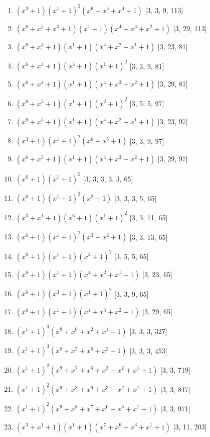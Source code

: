 \documentclass[10pt,twocolumn]{article}
\begin{document}
\begin{enumerate}
\item $(x^{3} + 1)(x^{1} + 1)^{2}(x^{6} + x^{5} + x^{4} + 1)$  [3, 3, 9, 113]
\item $(x^{6} + x^{5} + x^{4} + 1)(x^{1} + 1)(x^{4} + x^{3} + x^{2} + 1)$  [3, 29, 113]
\item $(x^{6} + x^{4} + 1)(x^{1} + 1)(x^{4} + x^{2} + x^{1} + 1)$  [3, 23, 81]
\item $(x^{6} + x^{4} + 1)(x^{3} + 1)(x^{1} + 1)^{2}$  [3, 3, 9, 81]
\item $(x^{6} + x^{4} + 1)(x^{1} + 1)(x^{4} + x^{3} + x^{2} + 1)$  [3, 29, 81]
\item $(x^{6} + x^{5} + 1)(x^{1} + 1)(x^{2} + 1)^{2}$  [3, 5, 5, 97]
\item $(x^{6} + x^{5} + 1)(x^{1} + 1)(x^{4} + x^{2} + x^{1} + 1)$  [3, 23, 97]
\item $(x^{3} + 1)(x^{1} + 1)^{2}(x^{6} + x^{5} + 1)$  [3, 3, 9, 97]
\item $(x^{6} + x^{5} + 1)(x^{1} + 1)(x^{4} + x^{3} + x^{2} + 1)$  [3, 29, 97]
\item $(x^{6} + 1)(x^{1} + 1)^{5}$  [3, 3, 3, 3, 3, 65]
\item $(x^{6} + 1)(x^{1} + 1)^{3}(x^{2} + 1)$  [3, 3, 3, 5, 65]
\item $(x^{3} + x^{1} + 1)(x^{6} + 1)(x^{1} + 1)^{2}$  [3, 3, 11, 65]
\item $(x^{6} + 1)(x^{1} + 1)^{2}(x^{3} + x^{2} + 1)$  [3, 3, 13, 65]
\item $(x^{6} + 1)(x^{1} + 1)(x^{2} + 1)^{2}$  [3, 5, 5, 65]
\item $(x^{6} + 1)(x^{1} + 1)(x^{4} + x^{2} + x^{1} + 1)$  [3, 23, 65]
\item $(x^{6} + 1)(x^{3} + 1)(x^{1} + 1)^{2}$  [3, 3, 9, 65]
\item $(x^{6} + 1)(x^{1} + 1)(x^{4} + x^{3} + x^{2} + 1)$  [3, 29, 65]
\item $(x^{1} + 1)^{3}(x^{8} + x^{6} + x^{2} + x^{1} + 1)$  [3, 3, 3, 327]
\item $(x^{1} + 1)^{3}(x^{8} + x^{7} + x^{6} + x^{2} + 1)$  [3, 3, 3, 453]
\item $(x^{1} + 1)^{2}(x^{9} + x^{7} + x^{6} + x^{3} + x^{2} + x^{1} + 1)$  [3, 3, 719]
\item $(x^{1} + 1)^{2}(x^{9} + x^{8} + x^{6} + x^{3} + x^{2} + x^{1} + 1)$  [3, 3, 847]
\item $(x^{1} + 1)^{2}(x^{9} + x^{8} + x^{7} + x^{6} + x^{3} + x^{1} + 1)$  [3, 3, 971]
\item $(x^{3} + x^{1} + 1)(x^{1} + 1)(x^{7} + x^{6} + x^{3} + x^{1} + 1)$  [3, 11, 203]

\end{enumerate}
\end{document}
